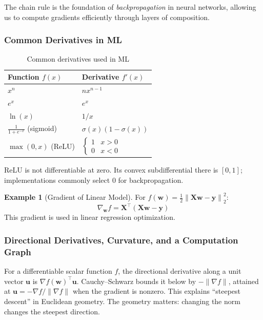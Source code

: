 \documentclass[11pt,twoside]{article}
\numberwithin{equation}{section}
\newcommand{\vect}[1]{\bm{#1}}
\newcommand{\mat}[1]{\bm{#1}}
\newcommand{\norm}[1]{\left\lVert#1\right\rVert}
\theoremstyle{plain}
\theoremstyle{definition}
\newtheorem{example}[theorem]{Example}
\theoremstyle{remark}
\newenvironment{keyidea}{
  \begin{tcolorbox}[colback=yellow!5!white,
                    colframe=yellow!50!black,
                    title=Key Idea,
                    breakable,
                    enhanced,
                    sharp corners,
                    boxrule=0.8pt,
                    left=6pt, right=6pt, top=6pt, bottom=6pt]
}{
  \end{tcolorbox}
}
\begin{document}
\begin{keyidea}
The chain rule is the foundation of \emph{backpropagation} in neural networks, allowing us to compute gradients efficiently through layers of composition.
\end{keyidea}

\subsubsection{Common Derivatives in ML}

\begin{table}[H]
\centering
\begin{tabular}{@{}ll@{}}
\toprule
Function $f(x)$ & Derivative $f'(x)$ \\
\midrule
$x^n$ & $nx^{n-1}$ \\
$e^x$ & $e^x$ \\
$\ln(x)$ & $1/x$ \\
$\frac{1}{1+e^{-x}}$ (sigmoid) & $\sigma(x)(1-\sigma(x))$ \\
$\max(0, x)$ (ReLU) & $\begin{cases} 1 & x > 0 \\ 0 & x < 0 \end{cases}$ \\
\bottomrule
\end{tabular}
\caption{Common derivatives used in ML}
\end{table}

ReLU is not differentiable at zero. Its convex subdifferential there is $[0,1]$; implementations commonly select $0$ for backpropagation.

\begin{example}[Gradient of Linear Model]
For $f(\vect{w}) = \frac{1}{2}\norm{\mat{X}\vect{w} - \vect{y}}_2^2$:
\[
\nabla_{\vect{w}} f = \mat{X}^\top(\mat{X}\vect{w} - \vect{y})
\]
This gradient is used in linear regression optimization.
\end{example}

\subsubsection{Directional Derivatives, Curvature, and a Computation Graph}
For a differentiable scalar function $f$, the directional derivative along a unit vector $\vect u$ is $\nabla f(\vect w)^\top\vect u$. Cauchy--Schwarz bounds it below by $-\|\nabla f\|$, attained at $\vect u=-\nabla f/\|\nabla f\|$ when the gradient is nonzero. This explains ``steepest descent'' in Euclidean geometry. The geometry matters: changing the norm changes the steepest direction.
\end{document}

